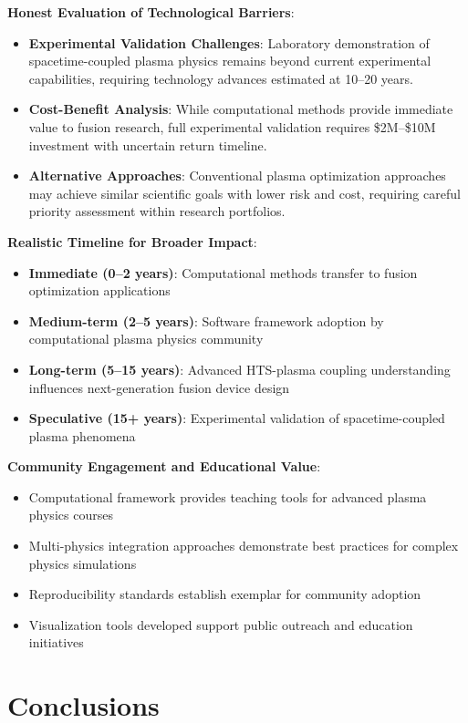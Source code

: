 \documentclass[12pt,a4paper]{article}
\begin{document}
\textbf{Honest Evaluation of Technological Barriers}:
\begin{itemize}
\item \textbf{Experimental Validation Challenges}: Laboratory demonstration of spacetime-coupled plasma physics remains beyond current experimental capabilities, requiring technology advances estimated at 10--20 years.
\item \textbf{Cost-Benefit Analysis}: While computational methods provide immediate value to fusion research, full experimental validation requires \$2M--\$10M investment with uncertain return timeline.
\item \textbf{Alternative Approaches}: Conventional plasma optimization approaches may achieve similar scientific goals with lower risk and cost, requiring careful priority assessment within research portfolios.
\end{itemize}

\textbf{Realistic Timeline for Broader Impact}:
\begin{itemize}
\item \textbf{Immediate (0--2 years)}: Computational methods transfer to fusion optimization applications
\item \textbf{Medium-term (2--5 years)}: Software framework adoption by computational plasma physics community
\item \textbf{Long-term (5--15 years)}: Advanced HTS-plasma coupling understanding influences next-generation fusion device design
\item \textbf{Speculative (15+ years)}: Experimental validation of spacetime-coupled plasma phenomena
\end{itemize}

\textbf{Community Engagement and Educational Value}:
\begin{itemize}
\item Computational framework provides teaching tools for advanced plasma physics courses
\item Multi-physics integration approaches demonstrate best practices for complex physics simulations  
\item Reproducibility standards establish exemplar for community adoption
\item Visualization tools developed support public outreach and education initiatives
\end{itemize}

\section{Conclusions}
\end{document}
